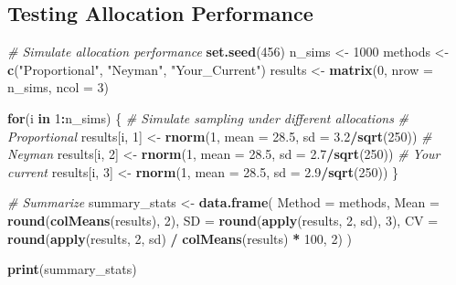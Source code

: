 \documentclass[
]{article}
\newenvironment{Shaded}{\begin{snugshade}}{\end{snugshade}}
\newcommand{\AttributeTok}[1]{\textcolor[rgb]{0.13,0.29,0.53}{#1}}
\newcommand{\CommentTok}[1]{\textcolor[rgb]{0.56,0.35,0.01}{\textit{#1}}}
\newcommand{\ControlFlowTok}[1]{\textcolor[rgb]{0.13,0.29,0.53}{\textbf{#1}}}
\newcommand{\DecValTok}[1]{\textcolor[rgb]{0.00,0.00,0.81}{#1}}
\newcommand{\FloatTok}[1]{\textcolor[rgb]{0.00,0.00,0.81}{#1}}
\newcommand{\FunctionTok}[1]{\textcolor[rgb]{0.13,0.29,0.53}{\textbf{#1}}}
\newcommand{\NormalTok}[1]{#1}
\newcommand{\OtherTok}[1]{\textcolor[rgb]{0.56,0.35,0.01}{#1}}
\newcommand{\SpecialCharTok}[1]{\textcolor[rgb]{0.81,0.36,0.00}{\textbf{#1}}}
\newcommand{\StringTok}[1]{\textcolor[rgb]{0.31,0.60,0.02}{#1}}
\begin{document}
\subsection{Testing Allocation
Performance}\label{testing-allocation-performance}

\begin{Shaded}
\begin{Highlighting}[]
\CommentTok{\# Simulate allocation performance}
\FunctionTok{set.seed}\NormalTok{(}\DecValTok{456}\NormalTok{)}
\NormalTok{n\_sims }\OtherTok{\textless{}{-}} \DecValTok{1000}
\NormalTok{methods }\OtherTok{\textless{}{-}} \FunctionTok{c}\NormalTok{(}\StringTok{"Proportional"}\NormalTok{, }\StringTok{"Neyman"}\NormalTok{, }\StringTok{"Your\_Current"}\NormalTok{)}
\NormalTok{results }\OtherTok{\textless{}{-}} \FunctionTok{matrix}\NormalTok{(}\DecValTok{0}\NormalTok{, }\AttributeTok{nrow =}\NormalTok{ n\_sims, }\AttributeTok{ncol =} \DecValTok{3}\NormalTok{)}

\ControlFlowTok{for}\NormalTok{(i }\ControlFlowTok{in} \DecValTok{1}\SpecialCharTok{:}\NormalTok{n\_sims) \{}
  \CommentTok{\# Simulate sampling under different allocations}
  \CommentTok{\# Proportional}
\NormalTok{  results[i, }\DecValTok{1}\NormalTok{] }\OtherTok{\textless{}{-}} \FunctionTok{rnorm}\NormalTok{(}\DecValTok{1}\NormalTok{, }\AttributeTok{mean =} \FloatTok{28.5}\NormalTok{, }\AttributeTok{sd =} \FloatTok{3.2}\SpecialCharTok{/}\FunctionTok{sqrt}\NormalTok{(}\DecValTok{250}\NormalTok{))}
  \CommentTok{\# Neyman  }
\NormalTok{  results[i, }\DecValTok{2}\NormalTok{] }\OtherTok{\textless{}{-}} \FunctionTok{rnorm}\NormalTok{(}\DecValTok{1}\NormalTok{, }\AttributeTok{mean =} \FloatTok{28.5}\NormalTok{, }\AttributeTok{sd =} \FloatTok{2.7}\SpecialCharTok{/}\FunctionTok{sqrt}\NormalTok{(}\DecValTok{250}\NormalTok{))}
  \CommentTok{\# Your current}
\NormalTok{  results[i, }\DecValTok{3}\NormalTok{] }\OtherTok{\textless{}{-}} \FunctionTok{rnorm}\NormalTok{(}\DecValTok{1}\NormalTok{, }\AttributeTok{mean =} \FloatTok{28.5}\NormalTok{, }\AttributeTok{sd =} \FloatTok{2.9}\SpecialCharTok{/}\FunctionTok{sqrt}\NormalTok{(}\DecValTok{250}\NormalTok{))}
\NormalTok{\}}

\CommentTok{\# Summarize}
\NormalTok{summary\_stats }\OtherTok{\textless{}{-}} \FunctionTok{data.frame}\NormalTok{(}
  \AttributeTok{Method =}\NormalTok{ methods,}
  \AttributeTok{Mean =} \FunctionTok{round}\NormalTok{(}\FunctionTok{colMeans}\NormalTok{(results), }\DecValTok{2}\NormalTok{),}
  \AttributeTok{SD =} \FunctionTok{round}\NormalTok{(}\FunctionTok{apply}\NormalTok{(results, }\DecValTok{2}\NormalTok{, sd), }\DecValTok{3}\NormalTok{),}
  \AttributeTok{CV =} \FunctionTok{round}\NormalTok{(}\FunctionTok{apply}\NormalTok{(results, }\DecValTok{2}\NormalTok{, sd) }\SpecialCharTok{/} \FunctionTok{colMeans}\NormalTok{(results) }\SpecialCharTok{*} \DecValTok{100}\NormalTok{, }\DecValTok{2}\NormalTok{)}
\NormalTok{)}

\FunctionTok{print}\NormalTok{(summary\_stats)}
\end{Highlighting}
\end{Shaded}
\end{document}
